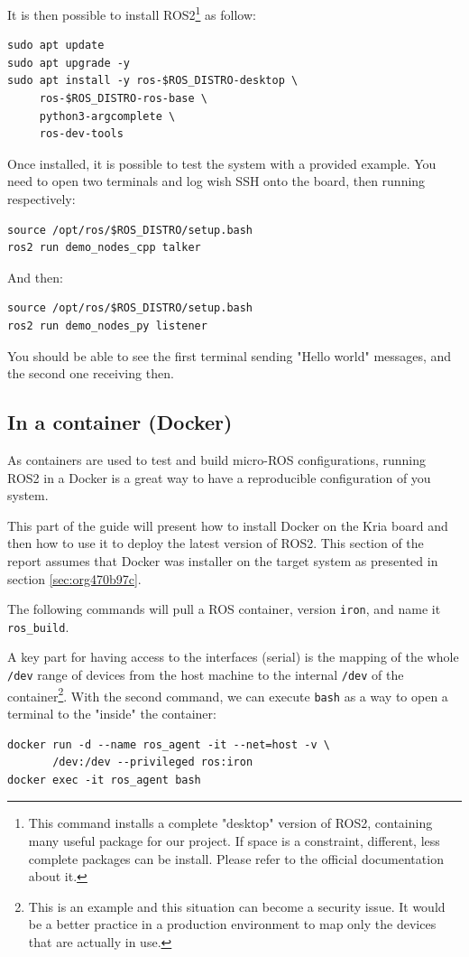 \documentclass[10pt]{article}
\begin{document}
It is then possible to install ROS2\footnote{This command installs a complete "desktop" version of ROS2, containing many
useful package for our project.
If space is a constraint, different, less complete packages can be install.
Please refer to the official documentation about it.} as follow:
\begin{verbatim}
sudo apt update
sudo apt upgrade -y
sudo apt install -y ros-$ROS_DISTRO-desktop \
     ros-$ROS_DISTRO-ros-base \
     python3-argcomplete \
     ros-dev-tools
\end{verbatim}

Once installed, it is possible to test the system with a provided example.
You need to open two terminals and log wish SSH onto the board, then running
respectively:
\begin{verbatim}
source /opt/ros/$ROS_DISTRO/setup.bash
ros2 run demo_nodes_cpp talker
\end{verbatim}

And then:
\begin{verbatim}
source /opt/ros/$ROS_DISTRO/setup.bash
ros2 run demo_nodes_py listener
\end{verbatim}

You should be able to see the first terminal sending "Hello world" messages,
and the second one receiving then.

\subsection{In a container (Docker)}
\label{sec:org1fccfe4}
As containers are used to test and build micro-ROS configurations,
running ROS2 in a Docker  is a great way to have a reproducible configuration
of you system.

This part of the guide will present how to install Docker on the
Kria board and then how to use it to deploy the latest version of ROS2.
This section of the report assumes that Docker was installer on the target system
as presented in section \ref{sec:org470b97c}.

The following commands will pull a ROS container, version \texttt{iron}, and name it \texttt{ros\_build}.

A key part for having access to the interfaces (serial) is the mapping of the whole \texttt{/dev}
range of devices from the host machine to the internal \texttt{/dev} of the container\footnote{This is an example and this situation can become a security issue. It would be a better practice
in a production environment to map only the devices that are actually in use.}.
With the second command, we can execute \texttt{bash} as a way to open a terminal to the "inside" the container:
\begin{verbatim}
docker run -d --name ros_agent -it --net=host -v \
       /dev:/dev --privileged ros:iron
docker exec -it ros_agent bash
\end{verbatim}
\end{document}
